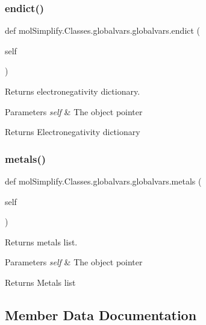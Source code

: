 \subsubsection{\texorpdfstring{endict()}{endict()}}
{\footnotesize\ttfamily def mol\+Simplify.\+Classes.\+globalvars.\+globalvars.\+endict (\begin{DoxyParamCaption}\item[{}]{self }\end{DoxyParamCaption})}



Returns electronegativity dictionary. 


\begin{DoxyParams}{Parameters}
{\em self} & The object pointer \\
\hline
\end{DoxyParams}
\begin{DoxyReturn}{Returns}
Electronegativity dictionary 
\end{DoxyReturn}
\mbox{\label{classmolSimplify_1_1Classes_1_1globalvars_1_1globalvars_a673cd53d924bdfef605d520b8c2ab3a8}} 
\subsubsection{\texorpdfstring{metals()}{metals()}}
{\footnotesize\ttfamily def mol\+Simplify.\+Classes.\+globalvars.\+globalvars.\+metals (\begin{DoxyParamCaption}\item[{}]{self }\end{DoxyParamCaption})}



Returns metals list. 


\begin{DoxyParams}{Parameters}
{\em self} & The object pointer \\
\hline
\end{DoxyParams}
\begin{DoxyReturn}{Returns}
Metals list 
\end{DoxyReturn}


\subsection{Member Data Documentation}
\mbox{\label{classmolSimplify_1_1Classes_1_1globalvars_1_1globalvars_a8645755df959297ba1969ac81b980d38}} 
